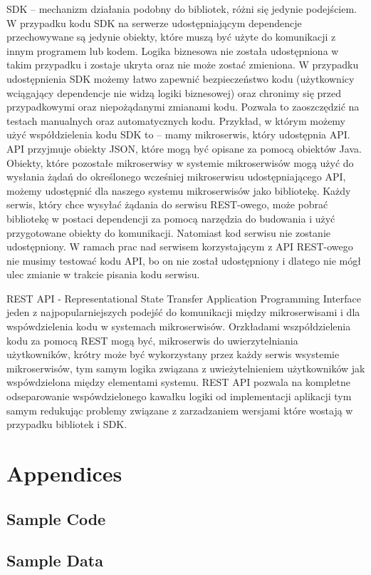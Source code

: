 \documentclass[runningheads,12pt]{llncs} \usepackage{graphicx} \usepackage{todonotes} \usepackage{fancyhdr} \usepackage{lipsum} \usepackage[T1]{fontenc} \usepackage[provide=*,english,polish]{babel}
\begin{document}
SDK – mechanizm działania podobny do bibliotek, różni się jedynie podejściem. W przypadku kodu SDK na serwerze udostępniającym dependencje przechowywane są jedynie obiekty, które muszą być użyte do komunikacji z innym programem lub kodem. Logika biznesowa nie została udostępniona w takim przypadku i zostaje ukryta oraz nie może zostać zmieniona. W przypadku udostępnienia SDK możemy łatwo zapewnić bezpieczeństwo kodu (użytkownicy wciągający dependencje nie widzą logiki biznesowej) oraz chronimy się przed przypadkowymi oraz niepożądanymi zmianami kodu. Pozwala to zaoszczędzić na testach manualnych oraz automatycznych kodu. Przykład, w którym możemy użyć współdzielenia kodu SDK to – mamy mikroserwis, który udostępnia API. API przyjmuje obiekty JSON, które mogą być opisane za pomocą obiektów Java. Obiekty, które pozostałe mikroserwisy w systemie mikroserwisów mogą użyć do wysłania żądań do określonego wcześniej mikroserwisu udostępniającego API, możemy udostępnić dla naszego systemu mikroserwisów jako bibliotekę. Każdy serwis, który chce wysyłać żądania do serwisu REST-owego, może pobrać bibliotekę w postaci dependencji za pomocą narzędzia do budowania i użyć przygotowane obiekty do komunikacji. Natomiast kod serwisu nie zostanie udostępniony. W ramach prac nad serwisem korzystającym z API REST-owego nie musimy testować kodu API, bo on nie został udostępniony i dlatego nie mógł ulec zmianie w trakcie pisania kodu serwisu.

REST API - Representational State Transfer Application Programming Interface jeden z najpopularniejszych podejść do komunikacji między mikroserwisami i dla wspówdzielenia kodu w systemach mikroserwisów. Orzkładami wszpółdzielenia kodu za pomocą REST mogą być, mikroserwis do uwierzytelniania użytkowników, krótry może być wykorzystany przez każdy serwis wsystemie mikroserwisów, tym samym logika związana z uwieżytelnieniem użytkowników jak wspówdzielona między elementami systemu. REST API pozwala na kompletne odseparowanie wspówdzielonego kawałku logiki od implementacji aplikacji tym samym redukując problemy związane z zarzadzaniem wersjami które wostają w przypadku bibliotek i SDK.  

\nocite{*}

\listoffigures

\listoftables

 

\section{Appendices}

\subsection{Sample Code} \subsection{Sample Data}
\end{document}

